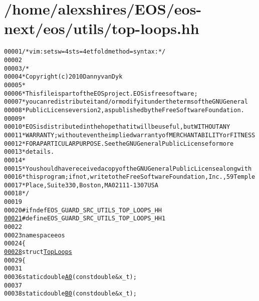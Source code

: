 \hypertarget{top-loops_8hh_source}{
\section{/home/alexshires/EOS/eos-\/next/eos/utils/top-\/loops.hh}
}


\begin{footnotesize}\begin{alltt}
00001 \textcolor{comment}{/* vim: set sw=4 sts=4 et foldmethod=syntax : */}
00002 
00003 \textcolor{comment}{/*}
00004 \textcolor{comment}{ * Copyright (c) 2010 Danny van Dyk}
00005 \textcolor{comment}{ *}
00006 \textcolor{comment}{ * This file is part of the EOS project. EOS is free software;}
00007 \textcolor{comment}{ * you can redistribute it and/or modify it under the terms of the GNU General}
00008 \textcolor{comment}{ * Public License version 2, as published by the Free Software Foundation.}
00009 \textcolor{comment}{ *}
00010 \textcolor{comment}{ * EOS is distributed in the hope that it will be useful, but WITHOUT ANY}
00011 \textcolor{comment}{ * WARRANTY; without even the implied warranty of MERCHANTABILITY or FITNESS}
00012 \textcolor{comment}{ * FOR A PARTICULAR PURPOSE.  See the GNU General Public License for more}
00013 \textcolor{comment}{ * details.}
00014 \textcolor{comment}{ *}
00015 \textcolor{comment}{ * You should have received a copy of the GNU General Public License along with}
00016 \textcolor{comment}{ * this program; if not, write to the Free Software Foundation, Inc., 59 Temple}
00017 \textcolor{comment}{ * Place, Suite 330, Boston, MA  02111-1307  USA}
00018 \textcolor{comment}{ */}
00019 
00020 \textcolor{preprocessor}{#ifndef EOS\_GUARD\_SRC\_UTILS\_TOP\_LOOPS\_HH}
\hypertarget{top-loops_8hh_source_l00021}{}\hyperlink{top-loops_8hh_abb46b9f7994015fef635d5d0186ca58d}{00021} \textcolor{preprocessor}{}\textcolor{preprocessor}{#define EOS\_GUARD\_SRC\_UTILS\_TOP\_LOOPS\_HH 1}
00022 \textcolor{preprocessor}{}
00023 \textcolor{keyword}{namespace }eos
00024 \{
\hypertarget{top-loops_8hh_source_l00028}{}\hyperlink{structeos_1_1TopLoops}{00028}     \textcolor{keyword}{struct }\hyperlink{structeos_1_1TopLoops}{TopLoops}
00029     \{
00031 
00036         \textcolor{keyword}{static} \textcolor{keywordtype}{double} \hyperlink{structeos_1_1TopLoops_a1e5d26b35652a99a5e3e125d5814b1cf}{A0}(\textcolor{keyword}{const} \textcolor{keywordtype}{double} & x\_t);
00037 
00038         \textcolor{keyword}{static} \textcolor{keywordtype}{double} \hyperlink{structeos_1_1TopLoops_a99b769758ffe71507b5424fd98657f43}{B0}(\textcolor{keyword}{const} \textcolor{keywordtype}{double} & x\_t);

\end{alltt}
\end{footnotesize}
